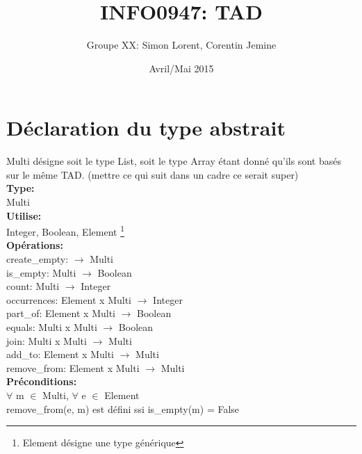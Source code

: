 \documentclass[a4paper, 11pt, oneside]{article}
\begin{document}

\title{INFO0947: TAD}
\author{Groupe XX: Simon Lorent, Corentin Jemine}
\date{Avril/Mai 2015}

\maketitle
\clearpage

\section{Déclaration du type abstrait}
	\indent Multi désigne soit le type List, soit le type Array étant donné qu'ils sont basés sur le même TAD. (mettre ce qui suit dans un cadre ce serait super)
	\\ \textbf{Type:}
	\\ \indent Multi
	\\ \textbf{Utilise:}
	\\ \indent Integer, Boolean, Element \footnote{Element désigne une type générique}
	\\ \textbf{Opérations:}
	\\ \indent create\_empty: $\rightarrow$ Multi
	\\ \indent is\_empty: Multi $\rightarrow$ Boolean
	\\ \indent count: Multi $\rightarrow$ Integer
	\\ \indent occurrences: Element x Multi $\rightarrow$ Integer
	\\ \indent part\_of: Element x Multi $\rightarrow$ Boolean
	\\ \indent equals: Multi x Multi $\rightarrow$ Boolean
	\\ \indent join: Multi x Multi $\rightarrow$ Multi
	\\ \indent add\_to: Element x Multi $\rightarrow$ Multi
	\\ \indent remove\_from: Element x Multi $\rightarrow$ Multi
	\\ \textbf{Préconditions:}
	\\ \indent $\forall$ m $\in$ Multi, $\forall$ e $\in$ Element
	\\ \indent remove\_from(e, m) est défini ssi is\_empty(m) = False
\end{document}

